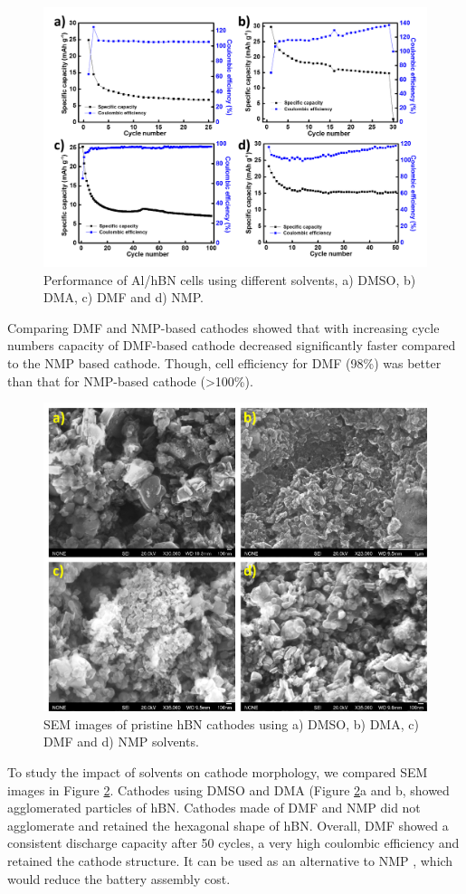 \begin{figure}[tbh!]
\centering
\includegraphics[width=\textwidth]{Figures/chap7fig/hBNsolventsCE}
\caption{Performance of Al/hBN cells using different solvents, a) DMSO, b) DMA, c) DMF and d) NMP.}
\label{Figures/chap7fig:hBNsolventsCE}
\end{figure}
Comparing DMF and NMP-based cathodes showed that with increasing cycle numbers capacity of DMF-based cathode decreased significantly faster compared to the NMP based cathode. Though, cell efficiency for DMF (98\%) was better than that for NMP-based cathode (>100\%).
\begin{figure}[tbh!]
\centering
\includegraphics[width=\textwidth]{Figures/chap7fig/hBNsolventSEM}
\caption{SEM images of pristine hBN cathodes using a) DMSO, b) DMA, c) DMF and d) NMP solvents.}
\label{Figures/chap7fig:hBNsolventSEM}
\end{figure}
To study the impact of solvents on cathode morphology, we compared SEM images in Figure \ref{Figures/chap7fig:hBNsolventSEM}. Cathodes using DMSO and DMA (Figure \ref{Figures/chap7fig:hBNsolventSEM}a and b, showed agglomerated particles of hBN. Cathodes made of DMF and NMP did not agglomerate and retained the hexagonal shape of hBN. Overall, DMF showed a consistent discharge capacity after 50 cycles, a very high coulombic efficiency and retained the cathode structure. It can be used as an alternative to NMP , which would reduce the battery assembly cost. 
